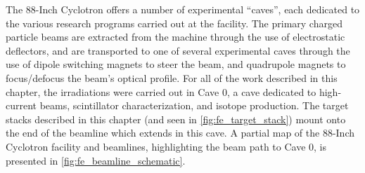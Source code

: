 The 88-Inch Cyclotron offers a number of experimental \enquote{caves}, each dedicated to the various research programs carried out at the facility.
The primary charged particle beams are extracted from the machine through the use of electrostatic deflectors, and are transported to one of several experimental caves through the use of dipole switching magnets to steer the beam, and quadrupole magnets to focus/defocus the beam's optical profile.
For all of the work described in this chapter, the irradiations were carried out in Cave 0, a cave dedicated to high-current beams, scintillator characterization, and isotope production.
The target stacks described in this chapter (and seen in \autoref{fig:fe_target_stack}) mount onto the end of the beamline which extends in this cave.
A partial map of the 88-Inch Cyclotron facility and beamlines, highlighting the beam path to Cave 0, is presented in  \autoref{fig:fe_beamline_schematic}.








